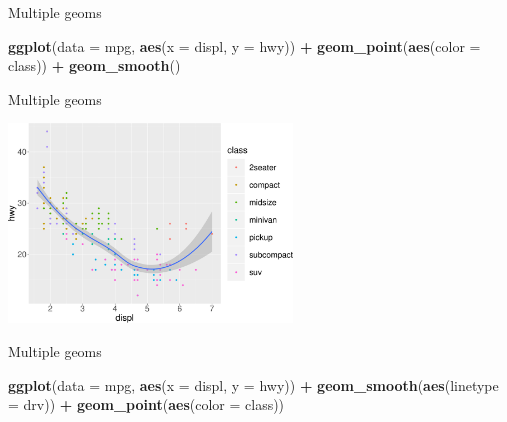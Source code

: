 \documentclass[ignorenonframetext,]{beamer}
\newenvironment{Shaded}{\begin{snugshade}}{\end{snugshade}}
\newcommand{\DataTypeTok}[1]{\textcolor[rgb]{0.13,0.29,0.53}{#1}}
\newcommand{\KeywordTok}[1]{\textcolor[rgb]{0.13,0.29,0.53}{\textbf{#1}}}
\newcommand{\NormalTok}[1]{#1}
\newcommand{\OperatorTok}[1]{\textcolor[rgb]{0.81,0.36,0.00}{\textbf{#1}}}
\newcommand{\StringTok}[1]{\textcolor[rgb]{0.31,0.60,0.02}{#1}}
\begin{document}
\begin{frame}[fragile]{Multiple geoms}
\protect\hypertarget{multiple-geoms-16}{}

\begin{Shaded}
\begin{Highlighting}[]
\KeywordTok{ggplot}\NormalTok{(}\DataTypeTok{data =}\NormalTok{ mpg, }\KeywordTok{aes}\NormalTok{(}\DataTypeTok{x =}\NormalTok{ displ, }\DataTypeTok{y =}\NormalTok{ hwy)) }\OperatorTok{+}\StringTok{ }
\StringTok{  }\KeywordTok{geom_point}\NormalTok{(}\KeywordTok{aes}\NormalTok{(}\DataTypeTok{color =}\NormalTok{ class)) }\OperatorTok{+}\StringTok{ }
\StringTok{  }\KeywordTok{geom_smooth}\NormalTok{()}
\end{Highlighting}
\end{Shaded}

\end{frame}

\begin{frame}{Multiple geoms}
\protect\hypertarget{multiple-geoms-17}{}

\begin{center}\includegraphics[height=200px]{data-visualization_files/figure-beamer/unnamed-chunk-95-1} \end{center}

\end{frame}

\begin{frame}[fragile]{Multiple geoms}
\protect\hypertarget{multiple-geoms-18}{}

\begin{Shaded}
\begin{Highlighting}[]
\KeywordTok{ggplot}\NormalTok{(}\DataTypeTok{data =}\NormalTok{ mpg, }\KeywordTok{aes}\NormalTok{(}\DataTypeTok{x =}\NormalTok{ displ, }\DataTypeTok{y =}\NormalTok{ hwy)) }\OperatorTok{+}\StringTok{ }
\StringTok{  }\KeywordTok{geom_smooth}\NormalTok{(}\KeywordTok{aes}\NormalTok{(}\DataTypeTok{linetype =}\NormalTok{ drv)) }\OperatorTok{+}
\StringTok{  }\KeywordTok{geom_point}\NormalTok{(}\KeywordTok{aes}\NormalTok{(}\DataTypeTok{color =}\NormalTok{ class))}
\end{Highlighting}
\end{Shaded}

\end{frame}
\end{document}
